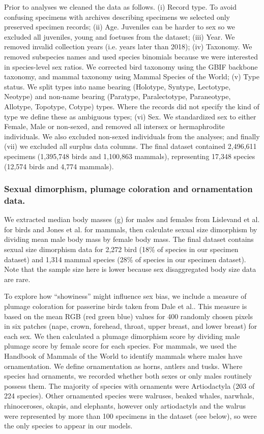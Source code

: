 \documentclass[a4paper, 12pt]{article}
\begin{document}
Prior to analyses we cleaned the data as follows. 
(i) Record type. To avoid confusing specimens with archives describing specimens we selected only preserved specimen records; 
(ii) Age. Juveniles can be harder to sex so we excluded all juveniles, young and foetuses from the dataset; 
(iii) Year. We removed invalid collection years (i.e. years later than 2018); 
(iv) Taxonomy. We removed subspecies names and used species binomials because we were  interested in species-level sex ratios. We corrected bird taxonomy using the GBIF backbone taxonomy\cite{gbif}, and mammal taxonomy using Mammal Species of the World\cite{wilson2005mammal}; 
(v) Type status. We split types into name bearing (Holotype, Syntype, Lectotype, Neotype) and non-name bearing (Paratype, Paralectotype, Paraneotype, Allotype, Topotype, Cotype) types. Where the records did not specify the kind of type we define these as ambiguous types; 
(vi) Sex. We standardized sex to either Female, Male or non-sexed, and removed all intersex or hermaphrodite individuals. 
We also excluded non-sexed individuals from the analyses; and finally 
(vii) we excluded all surplus data columns. 
The final dataset contained 2,496,611 specimens (1,395,748 birds and 1,100,863 mammals), representing 17,348 species (12,574 birds and 4,774 mammals). 

\subsubsection{Sexual dimorphism, plumage coloration and ornamentation data.}
We extracted median body masses (g) for males and females from Lislevand et al.\cite{lislevand2007avian} for birds and Jones et al.\cite{pantheria} for mammals, then calculate sexual size dimorphism by dividing mean male body mass by female body mass. 
The final dataset contains sexual size dimorphism data for 2,272 bird (18\% of species in our specimen dataset) and 1,314 mammal species (28\% of species in our specimen dataset). 
Note that the sample size here is lower because sex disaggregated body size data are rare.

To explore how ``showiness'' might influence sex bias, we include a measure of plumage coloration for passerine birds taken from Dale et al.\cite{dale2015data,dale2015effects}. 
This measure is based on the mean RGB (red green blue) values for 400 randomly chosen pixels in six patches (nape, crown, forehead, throat, upper breast, and lower breast) for each sex. 
We then calculated a plumage dimorphism score by dividing male plumage score by female score for each species. 
For mammals, we used the Handbook of Mammals of the World to identify mammals where males have ornamentation. We define ornamentation as horns, antlers and tusks. 
Where species had ornaments, we recorded whether both sexes or only males routinely possess them. The majority of species with ornaments were Artiodactyla (203 of 224 species). 
Other ornamented species were walruses, beaked whales, narwhals, rhinoceroses, okapis, and elephants, however only artiodactyls and the walrus were represented by more than 100 specimens in the dataset (see below), so were the only species to appear in our models.
\end{document}
